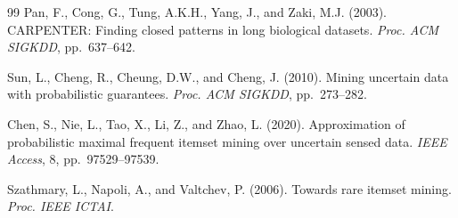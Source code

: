 \documentclass[12pt,a4paper]{report}
\begin{document}
\begin{thebibliography}{99}
    Pan, F., Cong, G., Tung, A.K.H., Yang, J., and Zaki, M.J. (2003). CARPENTER: Finding closed patterns in long biological datasets. \textit{Proc. ACM SIGKDD}, pp.~637--642.

    Sun, L., Cheng, R., Cheung, D.W., and Cheng, J. (2010). Mining uncertain data with probabilistic guarantees. \textit{Proc. ACM SIGKDD}, pp.~273--282.

    Chen, S., Nie, L., Tao, X., Li, Z., and Zhao, L. (2020). Approximation of probabilistic maximal frequent itemset mining over uncertain sensed data. \textit{IEEE Access}, 8, pp.~97529--97539.

    Szathmary, L., Napoli, A., and Valtchev, P. (2006). Towards rare itemset mining. \textit{Proc. IEEE ICTAI}.

  \end{thebibliography}
\end{document}
